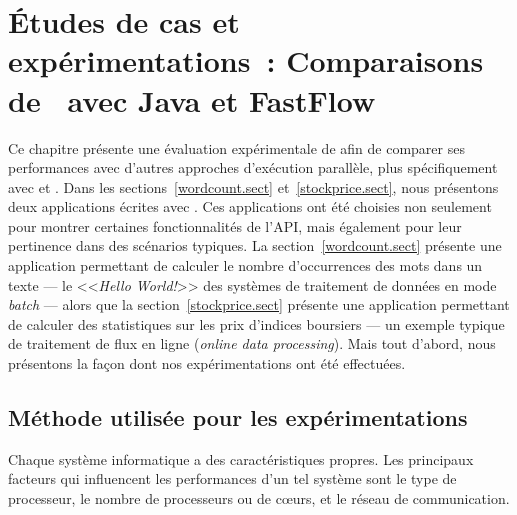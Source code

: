 
\chapter{\'Etudes de cas et exp\'erimentations~: Comparaisons de \ppff\ avec Java et FastFlow}
\label{experiences.chap}


Ce chapitre pr\'esente une \'evaluation exp\'erimentale de  afin de comparer ses performances avec d'autres approches d'ex\'ecution parall\`ele, plus sp\'ecifiquement avec  et .
%
Dans les sections~\ref{wordcount.sect} et~\ref{stockprice.sect}, nous pr\'esentons deux applications \'ecrites avec \PpFf. Ces applications ont \'et\'e choisies non seulement pour montrer certaines fonctionnalit\'es de l'API, mais \'egalement pour leur pertinence dans des sc\'enarios typiques. La section~\ref{wordcount.sect} pr\'esente une application permettant de calculer le nombre d'occurrences des mots dans un texte --- le <<\emph{Hello World!}>> des syst\`emes de traitement de donn\'ees en mode \emph{batch} --- alors que la section~\ref{stockprice.sect} pr\'esente une application permettant de calculer des statistiques sur les prix d'indices boursiers --- un exemple typique de traitement de flux en ligne (\emph{online data processing}). Mais tout d'abord, nous pr\'esentons la fa\c{c}on dont nos exp\'erimentations ont \'et\'e effectu\'ees.




\section{M\'ethode utilis\'ee pour les exp\'erimentations}
\label{usedMethodsForBenchmarks.chap}

Chaque syst\`eme informatique a des caract\'eristiques propres. Les principaux facteurs qui influencent les performances d'un tel syst\`eme sont le type de processeur, le nombre de processeurs ou de c\oe{}urs, et le r\'eseau de communication. 



